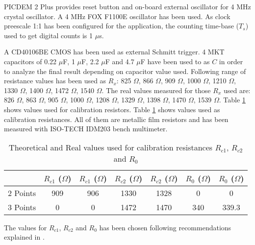 PICDEM 2 Plus provides reset button and on-board external oscillator for 4 MHz crystal oscillator. A 4 MHz FOX F1100E oscillator has been used. As clock preescale 1:1 has been configured for the application, the counting time-base ($T_{s}$) used to get digital counts is 1 $\mu$s.
\medskip

A CD40106BE CMOS has been used as external Schmitt trigger. 4 MKT capacitors of 0.22 $\mu$F, 1 $\mu$F, 2.2 $\mu$F and 4.7 $\mu$F have been used to as $C$ in order to analyze the final result depending on capacitor value used. Following range of resistance values has been used as $R_{x}$: 825 $\Omega$, 866 $\Omega$, 909 $\Omega$, 1000 $\Omega$, 1210 $\Omega$, 1330 $\Omega$, 1400 $\Omega$, 1472 $\Omega$, 1540 $\Omega$. The real values measured for those $R_{x}$ used are: 826 $\Omega$, 863 $\Omega$, 905 $\Omega$, 1000 $\Omega$, 1208 $\Omega$, 1329 $\Omega$, 1398 $\Omega$, 1470 $\Omega$, 1539 $\Omega$. Table \ref{tab:CalibrationResUsedInR} shows values used for calibration resistors. Table \ref{tab:CalibrationResUsedInR} shows values used as calibration resistances. All of them are metallic film resistors and has been measured with ISO-TECH IDM203 bench multimeter.

\begin{savenotes}
	\begin{table}[!ht]
	\centering
		\begin{tabular}{|c|c|c|c|c|c|c|}
		\hline 
		& $R_{c1}$ ($\Omega$) & $R_{c1}$ ($\Omega$) & $R_{c2}$ ($\Omega$) & $R_{c2}$ ($\Omega$) & $R_{0}$ ($\Omega$) & $R_{0}$ ($\Omega$) \\
		\hline
		2 Points & 909 & 906 & 1330 & 1328 & 0 & 0 \\
		\hline
		3 Points & 0 & 0 & 1472 & 1470 & 340 & 339.3 \\
		\hline
		\end{tabular}
	\caption{Theoretical and Real values used for calibration resistances $R_{c1}$, $R_{c2}$ and $R_{0}$}
	\label{tab:CalibrationResUsedInR}
	\end{table}
\end{savenotes}

The values for $R_{c1}$, $R_{c2}$ and $R_{0}$ has been chosen following recommendations explained in \cite{Art:Accuracy}.